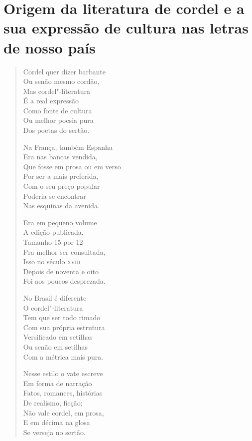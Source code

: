 \chapter{Origem da literatura de cordel e a sua expressão de cultura nas letras de nosso país}

\begin{verse}
Cordel quer dizer barbante \\
Ou senão mesmo cordão, \\
Mas cordel"-literatura \\
É a real expressão \\
Como fonte de cultura \\
Ou melhor poesia pura \\
Dos poetas do sertão. 

Na França, também Espanha \\
Era nas bancas vendida, \\
Que fosse em prosa ou em verso \\
Por ser a mais preferida, \\
Com o seu preço popular \\
Poderia se encontrar \\
Nas esquinas da avenida. 
\pagebreak

Era em pequeno volume \\
A edição publicada, \\
Tamanho 15 por 12 \\
Pra melhor ser consultada, \\
Isso no século \textsc{xviii} \\
Depois de noventa e oito \\
Foi aos poucos desprezada. 

No Brasil é diferente \\
O cordel"-literatura \\
Tem que ser todo rimado \\
Com sua própria estrutura \\
Versificado em setilhas \\
Ou senão em setilhas \\
Com a métrica mais pura. 

Nesse estilo o vate escreve \\
Em forma de narração \\
Fatos, romances, histórias \\
De realismo, ficção; \\
Não vale cordel, em prosa, \\
E em décima na glosa \\
Se verseja no sertão. 


\end{verse}
